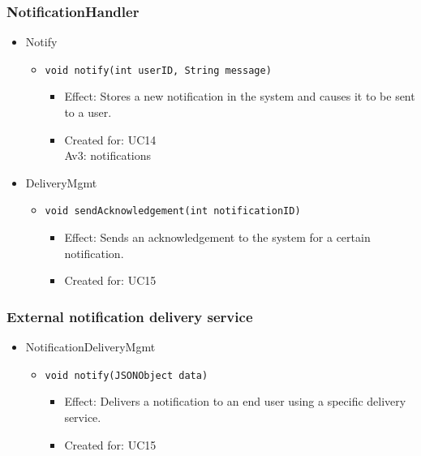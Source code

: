     \subsubsection{NotificationHandler}
        \begin{itemize}
            \item Notify
            \begin{itemize}
                \item \texttt{void notify(int userID, String message)}
                \begin{itemize}
                    \item Effect: Stores a new notification in the system and
                          causes it to be sent to a user.
                    \item Created for: UC14 \\
                          Av3: notifications
                \end{itemize}
            \end{itemize}

            \item DeliveryMgmt
            \begin{itemize}
                \item \texttt{void sendAcknowledgement(int notificationID)}
                \begin{itemize}
                    \item Effect: Sends an acknowledgement to the system for a certain notification.
                    \item Created for: UC15
                \end{itemize}
            \end{itemize}
        \end{itemize}

    \subsubsection{External notification delivery service}
        \begin{itemize}
            \item NotificationDeliveryMgmt
            \begin{itemize}
                \item \texttt{void notify(JSONObject data)}
                \begin{itemize}
                    \item Effect: Delivers a notification to an end user using a specific delivery service.
                    \item Created for: UC15
                \end{itemize}
            \end{itemize}
        \end{itemize}

